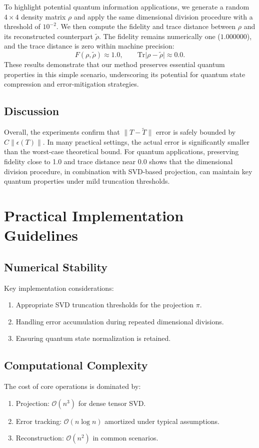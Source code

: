 \documentclass[sn-mathphys-num]{sn-jnl}
\theoremstyle{thmstyleone}
\theoremstyle{thmstyletwo}
\theoremstyle{thmstylethree}
\begin{document}
To highlight potential quantum information applications, we generate a random \(4\times 4\) density matrix \(\rho\) and apply the same dimensional division procedure with a threshold of \(10^{-2}\). We then compute the fidelity and trace distance between \(\rho\) and its reconstructed counterpart \(\tilde{\rho}\). The fidelity remains numerically one (\(1.000000\)), and the trace distance is zero within machine precision:
\[
F(\rho,\tilde{\rho}) \approx 1.0, 
\qquad
\mathrm{Tr}\bigl|\rho - \tilde{\rho}\bigr| \approx 0.0.
\]
These results demonstrate that our method preserves essential quantum properties in this simple scenario, underscoring its potential for quantum state compression and error-mitigation strategies.

\subsection{Discussion}
Overall, the experiments confirm that \(\|T-\tilde{T}\|\) error is safely bounded by \(C \|\epsilon(T)\|\). In many practical settings, the actual error is significantly smaller than the worst-case theoretical bound. For quantum applications, preserving fidelity close to 1.0 and trace distance near 0.0 shows that the dimensional division procedure, in combination with SVD-based projection, can maintain key quantum properties under mild truncation thresholds.

\section{Practical Implementation Guidelines}

\subsection{Numerical Stability}
Key implementation considerations:
\begin{enumerate}
    \item Appropriate SVD truncation thresholds for the projection $\pi$.  
    \item Handling error accumulation during repeated dimensional divisions.  
    \item Ensuring quantum state normalization is retained.
\end{enumerate}

\subsection{Computational Complexity}
The cost of core operations is dominated by:
\begin{enumerate}
    \item Projection: $\mathcal{O}(n^3)$ for dense tensor SVD.  
    \item Error tracking: $\mathcal{O}(n \log n)$ amortized under typical assumptions.  
    \item Reconstruction: $\mathcal{O}(n^2)$ in common scenarios.
\end{enumerate}
\end{document}
